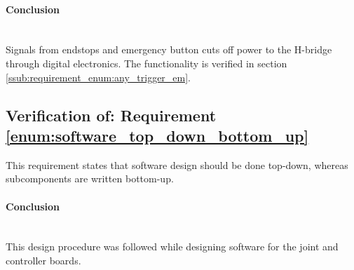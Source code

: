 \paragraph{Conclusion}~\\
Signals from endstops and emergency button cuts off power to the H-bridge through digital electronics.
The functionality is verified in section \ref{ssub:requirement_enum:any_trigger_em}.

\subsection{Verification of: Requirement \ref{enum:software_top_down_bottom_up}} %
\label{sub:verification_of_requirement_enum:software_top_down_bottom_up}
This requirement states that software design should be done top-down, whereas subcomponents are written bottom-up.

\paragraph{Conclusion}~\\
This design procedure was followed while designing software for the joint and controller boards.